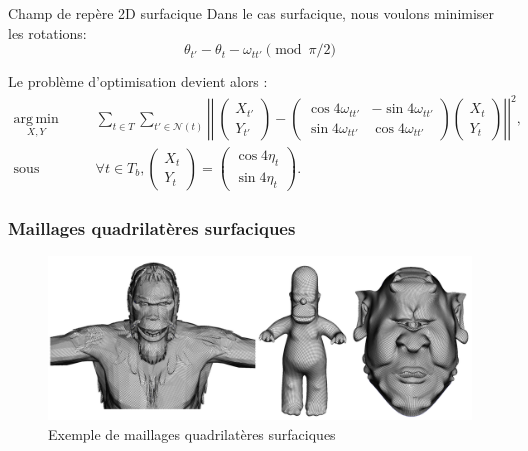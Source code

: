 \documentclass{beamer}
\DeclareMathOperator*{\argmin}{arg\,min}
\begin{document}
\begin{frame}{Champ de repère 2D surfacique}
    \small
    Dans le cas surfacique, nous voulons minimiser les rotations:
    $$
        \theta_{t'} - \theta_{t} - \omega_{tt'} \pmod{\pi/2}
    $$

    Le problème d'optimisation devient alors :
    \small{
    \begin{equation*}
    \begin{array}{ll}
    \underset{X, Y}{\argmin} & \underset{t \in T}{\displaystyle\sum} \underset{t' \in \mathcal{N}(t)}{\displaystyle\sum} \left|\left|\ \begin{pmatrix} X_{t'}\\ Y_{t'}\end{pmatrix} - \begin{pmatrix}\cos4\omega_{tt'} & -\sin4\omega_{tt'} \\ \sin4\omega_{tt'} & \cos4\omega_{tt'} \end{pmatrix} \begin{pmatrix} X_{t}\\ Y_{t}\end{pmatrix} \right|\right|^2, \\
    \text{sous contrainte: } & \forall t \in T_b, \begin{pmatrix} X_{t}\\ Y_{t}\end{pmatrix} = \begin{pmatrix} \cos4\eta_t\\ \sin4\eta_t\end{pmatrix}.
    \end{array}
    \end{equation*}
    }
\end{frame}

\begin{frame}
    \frametitle{Maillages quadrilatères surfaciques}
    \begin{figure}
    \centering
    \includegraphics[width=\textwidth]{img/new_images/CG_models.PNG}
    \caption{Exemple de maillages quadrilatères surfaciques}
    \end{figure}
\end{frame}
    
\end{document}
